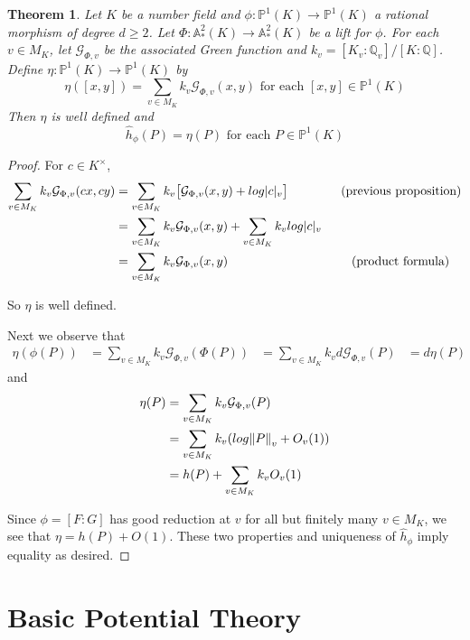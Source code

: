 \documentclass[12pt]{amsart}
\newtheorem{thm}{Theorem}[subsection]
\theoremstyle{definition}
\theoremstyle{remark}
\theoremstyle{definition}
\newcommand{\AFAF}{\mathbb{A}^2}
\newcommand{\Q}{\mathbb{Q}}
\renewcommand{\P}{\mathbb{P}}
\newcommand{\MCG}{\mathcal{G}}
\begin{document}
\begin{thm}
Let $K$ be a number field and $\phi:\P^1(K) \rightarrow \P^1(K)$ a rational morphism of degree $d \geq 2$. Let $\Phi:\AFAF_*(K) \rightarrow \AFAF_*(K)$ be a lift for $\phi$. For each $v \in M_K$, let $\MCG_{\Phi,v}$ be the associated Green function and $k_v = [K_v:\Q_v]/[K:\Q]$. Define $\eta: \P^1(K) \rightarrow \P^1(K)$ by $$\eta([x,y]) = \sum_{v \in M_K}k_v\MCG_{\Phi,v}(x,y) \text{ for each } [x,y] \in \P^1(K)$$ Then $\eta$ is well defined and  $$\hat{h}_{\phi}(P) = \eta(P) \text{ for each } P \in \P^1(K)$$
\end{thm}

\begin{proof}
For $c \in K^{\times}$, 
\begin{align*}
\sum_{v \in M_K}k_v \MCG_{\Phi,v}(cx,cy) 
&= \sum_{v \in M_K}k_v \big[\MCG_{\Phi,v}(x,y)+log|c|_v\big] \hspace{15mm} \text{(previous proposition)}\\
&= \sum_{v \in M_K}k_v \MCG_{\Phi,v}(x,y) +\sum_{v \in M_K}k_vlog|c|_v\\
&= \sum_{v \in M_K}k_v \MCG_{\Phi,v}(x,y) \hspace{35mm}\text{(product formula)}
\end{align*}

\noindent So $\eta$ is well defined.

Next we observe that 
\begin{align*}
\eta (\phi (P)) 
&= \sum_{v \in M_K} k_v \MCG_{\Phi, v}(\Phi(P))
&= \sum_{v \in M_K} k_v d\MCG_{\Phi, v}(P)
&= d \eta(P)
\end{align*} 
and 
\begin{align*}
\eta(P) 
&= \sum_{v \in M_K} k_v \MCG_{\Phi, v}(P)\\
&= \sum_{v \in M_K} k_v (log\norm{P}_v +O_v(1))\\
&= h(P) + \sum_{v \in M_K} k_v O_v(1) 
\end{align*}

Since $\phi = [F:G]$ has good reduction at $v$ for all but finitely many $v \in M_K$, we see that $\eta = h(P)+O(1)$. These two properties and uniqueness of $\hat{h}_{\phi}$ imply equality as desired.

\end{proof}


\section{Basic Potential Theory}
\end{document}
